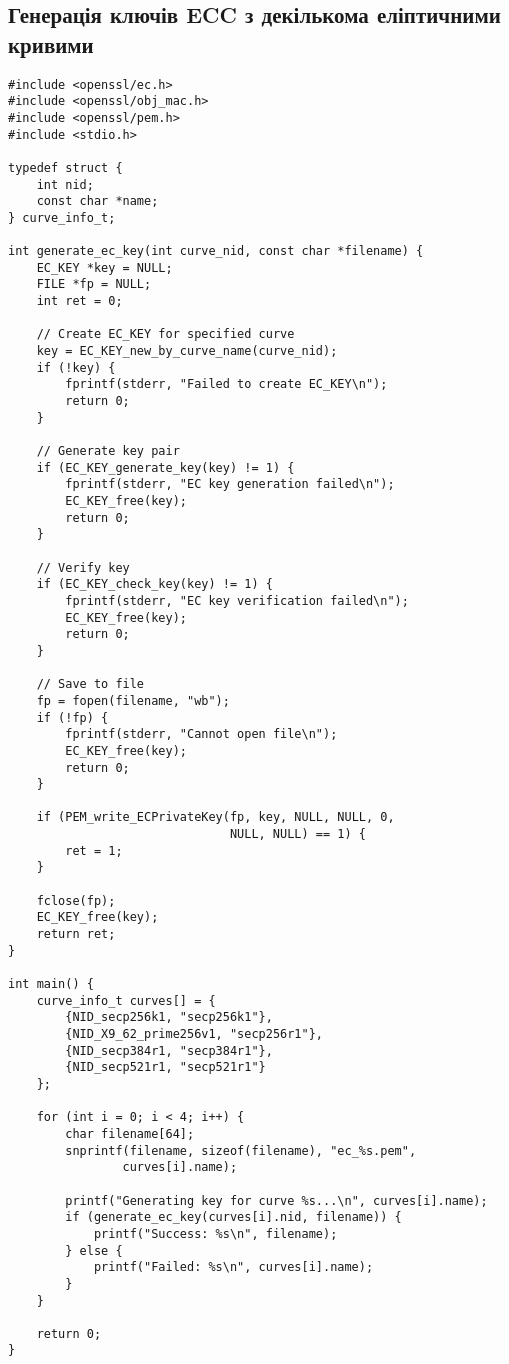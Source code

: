 \subsection{Генерація ключів ECC з декількома еліптичними кривими}

\begin{verbatim}
#include <openssl/ec.h>
#include <openssl/obj_mac.h>
#include <openssl/pem.h>
#include <stdio.h>

typedef struct {
    int nid;
    const char *name;
} curve_info_t;

int generate_ec_key(int curve_nid, const char *filename) {
    EC_KEY *key = NULL;
    FILE *fp = NULL;
    int ret = 0;
    
    // Create EC_KEY for specified curve
    key = EC_KEY_new_by_curve_name(curve_nid);
    if (!key) {
        fprintf(stderr, "Failed to create EC_KEY\n");
        return 0;
    }
    
    // Generate key pair
    if (EC_KEY_generate_key(key) != 1) {
        fprintf(stderr, "EC key generation failed\n");
        EC_KEY_free(key);
        return 0;
    }
    
    // Verify key
    if (EC_KEY_check_key(key) != 1) {
        fprintf(stderr, "EC key verification failed\n");
        EC_KEY_free(key);
        return 0;
    }
    
    // Save to file
    fp = fopen(filename, "wb");
    if (!fp) {
        fprintf(stderr, "Cannot open file\n");
        EC_KEY_free(key);
        return 0;
    }
    
    if (PEM_write_ECPrivateKey(fp, key, NULL, NULL, 0, 
                               NULL, NULL) == 1) {
        ret = 1;
    }
    
    fclose(fp);
    EC_KEY_free(key);
    return ret;
}

int main() {
    curve_info_t curves[] = {
        {NID_secp256k1, "secp256k1"},
        {NID_X9_62_prime256v1, "secp256r1"},
        {NID_secp384r1, "secp384r1"},
        {NID_secp521r1, "secp521r1"}
    };
    
    for (int i = 0; i < 4; i++) {
        char filename[64];
        snprintf(filename, sizeof(filename), "ec_%s.pem", 
                curves[i].name);
        
        printf("Generating key for curve %s...\n", curves[i].name);
        if (generate_ec_key(curves[i].nid, filename)) {
            printf("Success: %s\n", filename);
        } else {
            printf("Failed: %s\n", curves[i].name);
        }
    }
    
    return 0;
}
\end{verbatim}

